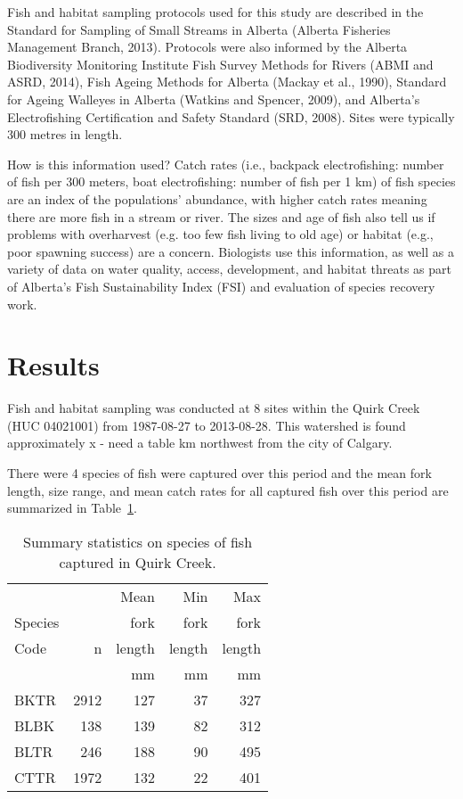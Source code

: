 \documentclass[]{article}\usepackage[]{graphicx}\usepackage[]{color}
\begin{document}
Fish and habitat sampling protocols used for this study are described 
in the Standard for Sampling of Small Streams in Alberta 
(Alberta Fisheries Management Branch, 2013). 
Protocols were also informed by the Alberta Biodiversity Monitoring Institute Fish Survey Methods for Rivers (ABMI and ASRD, 2014), 
Fish Ageing Methods for Alberta (Mackay et al., 1990), 
Standard for Ageing Walleyes in Alberta (Watkins and Spencer, 2009), 
and Alberta's Electrofishing Certification and Safety Standard (SRD, 2008). 
Sites were typically 300 metres in length.

How is this information used?
Catch rates (i.e., backpack electrofishing: number of fish per 300 meters, 
boat electrofishing: number of fish per 1 km) 
of fish species are an index of the populations' abundance, 
with higher catch rates meaning there are more fish in a stream or river. 
The sizes and age of fish also tell us if problems with overharvest 
(e.g. too few fish living to old age) or habitat (e.g., poor spawning success) 
are a concern. Biologists use this information, as well as a variety 
of data on water quality, access, development, and 
habitat threats as part of Alberta’s Fish Sustainability Index (FSI)
and evaluation of species recovery work. 

\section{Results}
\noindent Fish and habitat sampling was conducted at 8
sites within the Quirk Creek
(HUC 04021001) from 1987-08-27 to 2013-08-28.
This watershed is found approximately {\LARGE x - need a table} 
km northwest from the city of Calgary.

There were 4 species of fish were captured over this period and the mean fork length, 
size range, and mean catch rates for all captured fish over this period are summarized in Table~\ref{tab:fishsummary}.



\begin{table}[h]
\centering
\captionsetup{width=.9\linewidth}
\caption{Summary statistics on species of fish captured in Quirk Creek.}
\label{tab:fishsummary}
\begin{tabular}{| l | r r r r | } \hline
           &           &  Mean   &  Min     & Max     \\
Species    &           &  fork   &  fork    & fork    \\
Code       &   n       &  length &  length  & length  \\
           &           & mm      &  mm      &  mm     \\ \hline
BKTR  &  2912  &  127  &  37  &  327 \\ 
BLBK  &  138  &  139  &  82  &  312 \\ 
BLTR  &  246  &  188  &  90  &  495 \\ 
CTTR  &  1972  &  132  &  22  &  401 \\ 
\hline 

\end{tabular}
\end{table}
\end{document}
